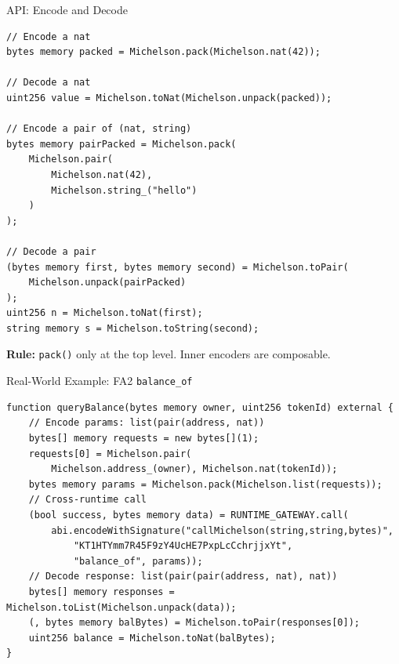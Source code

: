 \documentclass[aspectratio=169,10pt]{beamer}
\begin{document}
\begin{frame}[fragile]{API: Encode and Decode}

\begin{lstlisting}[language=Solidity]
// Encode a nat
bytes memory packed = Michelson.pack(Michelson.nat(42));

// Decode a nat
uint256 value = Michelson.toNat(Michelson.unpack(packed));

// Encode a pair of (nat, string)
bytes memory pairPacked = Michelson.pack(
    Michelson.pair(
        Michelson.nat(42),
        Michelson.string_("hello")
    )
);

// Decode a pair
(bytes memory first, bytes memory second) = Michelson.toPair(
    Michelson.unpack(pairPacked)
);
uint256 n = Michelson.toNat(first);
string memory s = Michelson.toString(second);
\end{lstlisting}

\smallskip
\textbf{Rule:} \texttt{pack()} only at the top level. Inner encoders are composable.
\end{frame}

\begin{frame}[fragile]{Real-World Example: FA2 \texttt{balance\_of}}

\begin{lstlisting}[language=Solidity]
function queryBalance(bytes memory owner, uint256 tokenId) external {
    // Encode params: list(pair(address, nat))
    bytes[] memory requests = new bytes[](1);
    requests[0] = Michelson.pair(
        Michelson.address_(owner), Michelson.nat(tokenId));
    bytes memory params = Michelson.pack(Michelson.list(requests));
    // Cross-runtime call
    (bool success, bytes memory data) = RUNTIME_GATEWAY.call(
        abi.encodeWithSignature("callMichelson(string,string,bytes)",
            "KT1HTYmm7R45F9zY4UcHE7PxpLcCchrjjxYt",
            "balance_of", params));
    // Decode response: list(pair(pair(address, nat), nat))
    bytes[] memory responses = Michelson.toList(Michelson.unpack(data));
    (, bytes memory balBytes) = Michelson.toPair(responses[0]);
    uint256 balance = Michelson.toNat(balBytes);
}
\end{lstlisting}
\end{frame}
\end{document}
